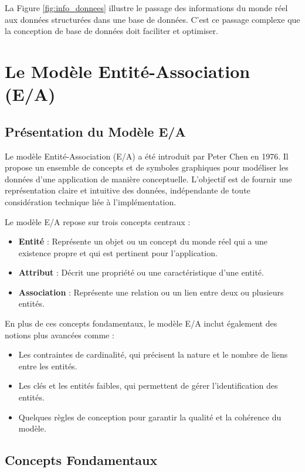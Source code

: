 \documentclass{article}
\begin{document}
La Figure \ref{fig:info_donnees} illustre le passage des informations du monde réel aux données structurées dans une base de données.  C'est ce passage complexe que la conception de base de données doit faciliter et optimiser.


\section{Le Modèle Entité-Association (E/A)}

\subsection{Présentation du Modèle E/A}

Le modèle Entité-Association (E/A) a été introduit par Peter Chen en 1976.  Il propose un ensemble de concepts et de symboles graphiques pour modéliser les données d'une application de manière conceptuelle.  L'objectif est de fournir une représentation claire et intuitive des données, indépendante de toute considération technique liée à l'implémentation.

Le modèle E/A repose sur trois concepts centraux :

\begin{itemize}
    \item \textbf{Entité} : Représente un objet ou un concept du monde réel qui a une existence propre et qui est pertinent pour l'application.
    \item \textbf{Attribut} : Décrit une propriété ou une caractéristique d'une entité.
    \item \textbf{Association} : Représente une relation ou un lien entre deux ou plusieurs entités.
\end{itemize}

En plus de ces concepts fondamentaux, le modèle E/A inclut également des notions plus avancées comme :

\begin{itemize}
    \item Les contraintes de cardinalité, qui précisent la nature et le nombre de liens entre les entités.
    \item Les clés et les entités faibles, qui permettent de gérer l'identification des entités.
    \item Quelques règles de conception pour garantir la qualité et la cohérence du modèle.
\end{itemize}

\subsection{Concepts Fondamentaux}
\end{document}
